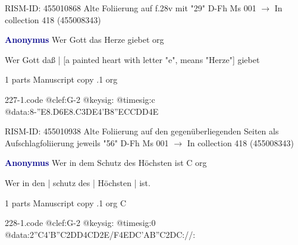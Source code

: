 \documentclass[twocolumn]{book}
\begin{document}
\newline RISM-ID: 455010868
\newline Alte Foliierung auf f.28v mit "29"
\newline D-Fh  Ms 001
\newline $\rightarrow$ In collection 418 (455008343)

\newline \par \vspace{7pt} \textcolor{darkblue}{\textbf{Anonymus  }}
\newline Wer Gott das Herze giebet    
\newline org
\newline \begin{itshape}[f.66r, at left:] Wer Gott daß | [a painted heart with letter "e", means "Herze"] giebet\end{itshape} 
\newline \textcolor{darkblue}{}  1 parts  
\newline Manuscript copy
.1  org  
\begin{filecontents*}{227-1.code}
@clef:G-2
@keysig:
@timesig:c
@data:8-{''E8.D6E}{8.C3DE}4'B{8''ECC}{DD}4E
\end{filecontents*}
\newline
%

\newline RISM-ID: 455010938
\newline Alte Foliierung auf den gegenüberliegenden Seiten als Aufschlagfoliierung jeweils "56"
\newline D-Fh  Ms 001
\newline $\rightarrow$ In collection 418 (455008343)

\newline \par \vspace{7pt} \textcolor{darkblue}{\textbf{Anonymus  }}
\newline Wer in dem Schutz des Höchsten ist  C  
\newline org
\newline \begin{itshape}[f.30v, at left:] Wer in den | schutz des | Höchsten | ist.\end{itshape} 
\newline \textcolor{darkblue}{}  1 parts  
\newline Manuscript copy
.1  org  C  
\begin{filecontents*}{228-1.code}
@clef:G-2
@keysig:
@timesig:0
@data:2''C4'B''C2DD4CD2E/F4EDC'AB''C2DC://:
\end{filecontents*}
\newline
%
\end{document}
